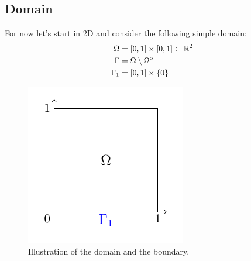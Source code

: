 \documentclass[
12pt,
a4paper,
onecolumn,
portrait
]{article}
\begin{document}
\subsection{Domain}
For now let's start in 2D and consider the following simple domain:
\begin{align*}
\Omega &= [0, 1] \times [0, 1] \subset \mathbb{R}^{2} \\
\Gamma &= \Omega \setminus {\kern0pt\Omega}^{\mathrm{o}} \\
\Gamma_1 &= [0, 1] \times \{0\}
\end{align*}
\begin{figure}[h]
\centering
\includegraphics[scale=1.5]{../graphics/domain.pdf}
\caption{Illustration of the domain and the boundary.}
\label{fig:domain-simple}
\end{figure}
\end{document}
